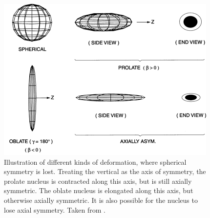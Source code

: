 \begin{figure}
    \centering
    \includegraphics[scale=2]{Introduction_Figs/DeformationCasten.png}
    \caption{Illustration of different kinds of deformation, where spherical symmetry is lost. Treating the vertical as the axis of symmetry, the prolate nucleus is contracted along this axis, but is still axially symmetric. The oblate nucleus is elongated along this axis, but otherwise axially symmetric. It is also possible for the nucleus to lose axial symmetry. Taken from \citep{casten90:_structure}.}
    \label{fig:deformation}
\end{figure}
